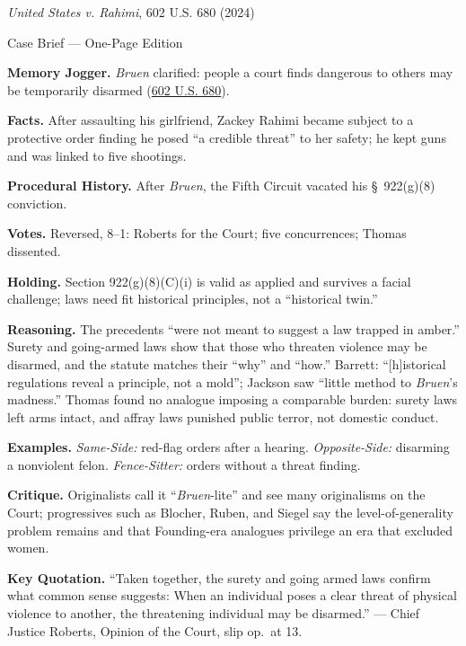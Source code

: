 \documentclass[12pt]{article}
\begin{document}
\begin{center}
{\Large \textit{United States v. Rahimi}, 602 U.S. 680 (2024)\par}
\vspace{0.3em}
{\normalsize Case Brief --- One-Page Edition\par}
\end{center}

\textbf{Memory Jogger.} \textit{Bruen} clarified: people a court finds dangerous to others may be temporarily disarmed (\href{https://www.law.cornell.edu/supremecourt/text/22-915}{602 U.S. 680}).

\textbf{Facts.} After assaulting his girlfriend, Zackey Rahimi became subject to a protective order finding he posed ``a credible threat'' to her safety; he kept guns and was linked to five shootings.

\textbf{Procedural History.} After \textit{Bruen}, the Fifth Circuit vacated his \S\ 922(g)(8) conviction.

\textbf{Votes.} Reversed, 8--1: Roberts for the Court; five concurrences; Thomas dissented.

\textbf{Holding.} Section 922(g)(8)(C)(i) is valid as applied and survives a facial challenge; laws need fit historical principles, not a ``historical twin.''

\textbf{Reasoning.} The precedents ``were not meant to suggest a law trapped in amber.'' Surety and going-armed laws show that those who threaten violence may be disarmed, and the statute matches their ``why'' and ``how.'' Barrett: ``[h]istorical regulations reveal a principle, not a mold''; Jackson saw ``little method to \textit{Bruen}'s madness.'' Thomas found no analogue imposing a comparable burden: surety laws left arms intact, and affray laws punished public terror, not domestic conduct.

\textbf{Examples.} \emph{Same-Side:} red-flag orders after a hearing. \emph{Opposite-Side:} disarming a nonviolent felon. \emph{Fence-Sitter:} orders without a threat finding.

\textbf{Critique.} Originalists call it ``\textit{Bruen}-lite'' and see many originalisms on the Court; progressives such as Blocher, Ruben, and Siegel say the level-of-generality problem remains and that Founding-era analogues privilege an era that excluded women.

\textbf{Key Quotation.} ``Taken together, the surety and going armed laws confirm what common sense suggests: When an individual poses a clear threat of physical violence to another, the threatening individual may be disarmed.'' --- Chief Justice Roberts, Opinion of the Court, slip op.\ at 13.
\end{document}
